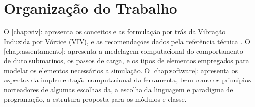 \section{Organização do Trabalho}

O \autoref{chap:viv}: apresenta os conceitos e as formulação por trás da Vibração Induzida por Vórtice (VIV), e as recomendações dados pela referência técnica . O \autoref{chap:assentamento}: apresenta a modelagem computacional do comportamento de duto submarinos, os passos de carga, e os tipos de elementos empregados para modelar os elementos necessários a simulação. O \autoref{chap:software}: apresenta os aspectos da implementação computacional da ferramenta, bem como os princípios norteadores de algumas escolhas da, a escolha da linguagem e paradigma de programação, a estrutura proposta para os módulos e classe.